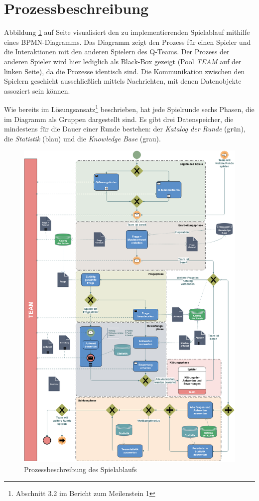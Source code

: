 \documentclass[a4paper,11pt,listof=numbered,glossary=totoc,parskip=half,toc=bib]{scrreprt}
\begin{document}
	\section{Prozessbeschreibung}
	\label{sec:process}
	
	Abbildung \ref{fig:bpmn} auf Seite \pageref{fig:bpmn} visualisiert den zu implementierenden Spielablauf mithilfe eines BPMN-Diagramms. Das Diagramm zeigt den Prozess für einen Spieler und die Interaktionen mit den anderen Spielern des Q-Teams. Der Prozess der anderen Spieler wird hier lediglich als Black-Box gezeigt (Pool \textit{TEAM} auf der linken Seite), da die Prozesse identisch sind. Die Kommunikation zwischen den Spielern geschieht ausschließlich mittels Nachrichten, mit denen Datenobjekte assoziert sein können.
	
	Wie bereits im Lösungsansatz\footnote{Abschnitt 3.2 im Bericht zum Meilenstein 1} beschrieben, hat jede Spielrunde sechs Phasen, die im Diagramm als Gruppen dargestellt sind. Es gibt drei Datenspeicher, die mindestens für die Dauer einer Runde bestehen: der \textit{Katalog der Runde} (grün), die \textit{Statistik} (blau) und die \textit{Knowledge Base} (grau).
	
	\begin{figure}
		\centering
		\includegraphics[width=\textwidth]{bpmn.png}
		\caption{Prozessbeschreibung des Spielablaufs}
		\label{fig:bpmn}
	\end{figure}	 
\end{document}
